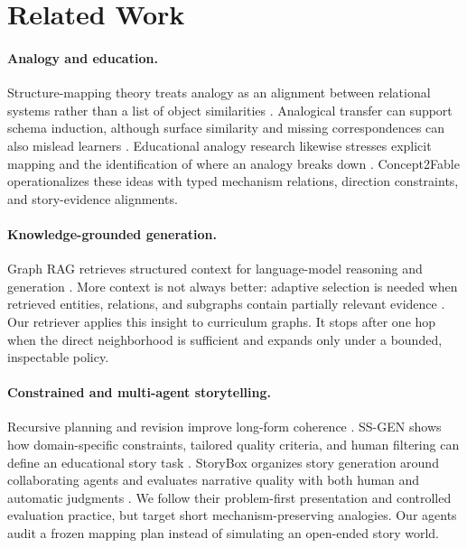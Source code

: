 \documentclass[letterpaper]{article} %
\begin{document}
\section{Related Work}

\paragraph{Analogy and education.}
Structure-mapping theory treats analogy as an alignment between relational systems rather than a list of object similarities \citep{gentner1983structure,gentner1997structure}. Analogical transfer can support schema induction, although surface similarity and missing correspondences can also mislead learners \citep{gick1983schema}. Educational analogy research likewise stresses explicit mapping and the identification of where an analogy breaks down \citep{glynn2008teaching}. Concept2Fable operationalizes these ideas with typed mechanism relations, direction constraints, and story-evidence alignments.

\paragraph{Knowledge-grounded generation.}
Graph RAG retrieves structured context for language-model reasoning and generation \citep{edge2024graphrag}. More context is not always better: adaptive selection is needed when retrieved entities, relations, and subgraphs contain partially relevant evidence \citep{xu2025amar}. Our retriever applies this insight to curriculum graphs. It stops after one hop when the direct neighborhood is sufficient and expands only under a bounded, inspectable policy.

\paragraph{Constrained and multi-agent storytelling.}
Recursive planning and revision improve long-form coherence \citep{yang2022re3}. SS-GEN shows how domain-specific constraints, tailored quality criteria, and human filtering can define an educational story task \citep{feng2025ssgen}. StoryBox organizes story generation around collaborating agents and evaluates narrative quality with both human and automatic judgments \citep{chen2026storybox}. We follow their problem-first presentation and controlled evaluation practice, but target short mechanism-preserving analogies. Our agents audit a frozen mapping plan instead of simulating an open-ended story world.
\end{document}
